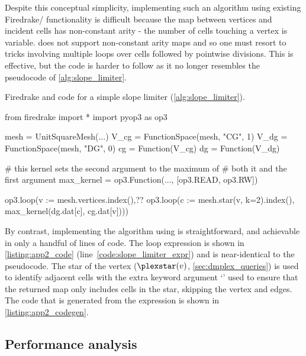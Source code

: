 \documentclass[thesis]{subfiles}
\begin{document}
Despite this conceptual simplicity, implementing such an algorithm using existing Firedrake/ functionality is difficult because the map between vertices and incident cells has non-constant arity - the number of cells touching a vertex is variable.
 does not support non-constant arity maps and so one must resort to tricks involving multiple loops over cells followed by pointwise divisions.
This is effective, but the code is harder to follow as it no longer resembles the pseudocode of \cref{alg:slope_limiter}.

\begin{listing}
  \centering
  \caption{
    Firedrake and  code for a simple slope limiter (\cref{alg:slope_limiter}).
  }
  \begin{minipage}{.9\textwidth}
    \begin{pyalg2}
      from firedrake import *
      import pyop3 as op3

      mesh = UnitSquareMesh(...)
      V_cg = FunctionSpace(mesh, "CG", 1)
      V_dg = FunctionSpace(mesh, "DG", 0)
      cg = Function(V_cg)
      dg = Function(V_dg)

      # this kernel sets the second argument to the maximum of
      # both it and the first argument
      max_kernel = op3.Function(..., [op3.READ, op3.RW])

      op3.loop(v := mesh.vertices.index(),?\label{code:slope_limiter_expr}?
               op3.loop(c := mesh.star(v, k=2).index(),
                        max_kernel(dg.dat[c], cg.dat[v])))
    \end{pyalg2}
  \end{minipage}
  \label{listing:app2_code}
\end{listing}


By contrast, implementing the algorithm using  is straightforward, and achievable in only a handful of lines of code.
The loop expression is shown in \cref{listing:app2_code} (line~\ref{code:slope_limiter_expr}) and is near-identical to the pseudocode.
The star of the vertex ($\plexstar(v)$, \cref{sec:dmplex_queries}) is used to identify adjacent cells with the extra keyword argument `' used to ensure that the returned map only includes cells in the star, skipping the vertex and edges.
The code that is generated from the expression is shown in \cref{listing:app2_codegen}.

\subsection{Performance analysis}

\end{document}
